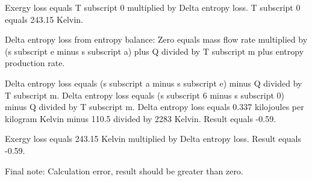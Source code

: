 Exergy loss equals T subscript 0 multiplied by Delta entropy loss.  
T subscript 0 equals 243.15 Kelvin.  

Delta entropy loss from entropy balance:  
Zero equals mass flow rate multiplied by (s subscript e minus s subscript a) plus Q divided by T subscript m plus entropy production rate.  

Delta entropy loss equals (s subscript a minus s subscript e) minus Q divided by T subscript m.  
Delta entropy loss equals (s subscript 6 minus s subscript 0) minus Q divided by T subscript m.  
Delta entropy loss equals 0.337 kilojoules per kilogram Kelvin minus 110.5 divided by 2283 Kelvin.  
Result equals -0.59.  

Exergy loss equals 243.15 Kelvin multiplied by Delta entropy loss.  
Result equals -0.59.  

Final note: Calculation error, result should be greater than zero.